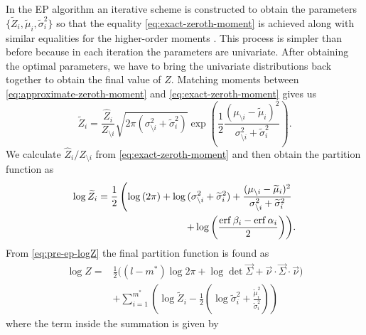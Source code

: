 \documentclass[11pt,twoside]{report}
\begin{document}
In the EP algorithm an iterative scheme is constructed to obtain the parameters $\{\widetilde{Z}_i, \widetilde{\mu}_i, \widetilde{\sigma}_i^2\}$ so that the equality \eqref{eq:exact-zeroth-moment} is achieved along with similar equalities for the higher-order moments \cite{Minka2001,MinkaUAI2001,Rasmussen2006,Cunningham2011}.
This process is simpler than before because in each iteration the parameters are univariate.
After obtaining the optimal parameters, we have to bring the univariate distributions back together to obtain the final value of $Z$.
Matching moments between \eqref{eq:approximate-zeroth-moment} and \eqref{eq:exact-zeroth-moment} gives us
\begin{equation}
  \widetilde{Z}_i = \frac{\widehat{Z}_i}{Z_{\setminus i}}
  \sqrt{2 \pi (\sigma_{\setminus i}^2 + \widetilde{\sigma}_i^2)}
  \exp{\left(
    \frac{1}{2}
    \frac{(\mu_{\setminus i} - \widetilde{\mu}_i)^2}{\sigma_{\setminus i}^2 + \widetilde{\sigma}_i^2}
    \right)}.
\end{equation}
We calculate $\widehat{Z}_i / Z_{\setminus i}$ from \eqref{eq:exact-zeroth-moment} and then obtain the partition function as
\begin{equation}\label{eq:well-behaved-logZhat}
  \begin{split}
    \log{\widetilde{Z}_i}
    =
    \frac{1}{2} \left(
    \log{(2\pi)} +
    \log{(\sigma_{\setminus i}^2 + \widetilde{\sigma}_i^2)} +
    \frac{(\mu_{\setminus i} - \widetilde{\mu}_i)^2}{\sigma_{\setminus i}^2 + \widetilde{\sigma}_i^2}
    \right.&
    \\
    \left.
    + \log{\left(\frac{\operatorname{erf}{\beta_i} - \operatorname{erf}{\alpha_i}}{2}\right)}
    \right)&.
  \end{split}
\end{equation}
From \eqref{eq:pre-ep-logZ} the final partition function is found as
\begin{equation}
  \begin{split}
    \log{Z}
    =&
    \frac{1}{2} \Big(
    (l-m^*) \log{2\pi}
    + \log\det{\vec{\Sigma}}
    + \vec{\nu} \cdot \vec{\Sigma} \cdot \vec{\nu}
    \Big)
    \\ &
    + \sum_{i=1}^{m^*} \left(
    \log{\widetilde{Z}_i}
    - \frac{1}{2}
    \left(
    \log{\widetilde{\sigma}_i^2}
    + \frac{\widetilde{\mu}_i^2}{\widetilde{\sigma}_i^2}
    \right)
    \right)
  \end{split}
\end{equation}
where the term inside the summation is given by \cite{Cunningham2011}
\end{document}
